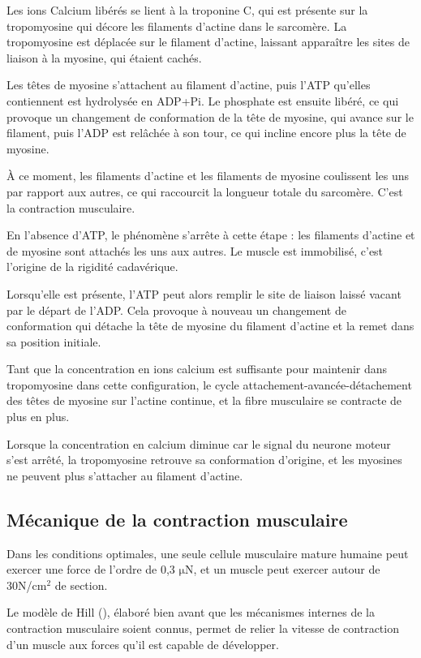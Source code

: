 \documentclass{report}
\newcommand{\micro}{$\mathrm{\mu}$}
\begin{document}
Les ions Calcium libérés se lient à la troponine C, qui est présente sur la tropomyosine qui décore les filaments d'actine dans le sarcomère. La tropomyosine est déplacée sur le filament d'actine, laissant apparaître les sites de liaison à la myosine, qui étaient cachés. 

Les têtes de myosine s'attachent au filament d'actine, puis l'ATP qu'elles contiennent est hydrolysée en ADP+Pi. Le phosphate est ensuite libéré, ce qui provoque un changement de conformation de la tête de myosine, qui avance sur le filament, puis l'ADP est relâchée à son tour, ce qui incline encore plus la tête de myosine. 

À ce moment, les filaments d'actine et les filaments de myosine coulissent les uns par rapport aux autres, ce qui raccourcit la longueur totale du sarcomère. C'est la contraction musculaire. 

En l'absence d'ATP, le phénomène s'arrête à cette étape : les filaments d'actine et de myosine sont attachés les uns aux autres. Le muscle est immobilisé, c'est l'origine de la rigidité cadavérique. 

Lorsqu'elle est présente, l'ATP peut alors remplir le site de liaison laissé vacant par le départ de l'ADP. Cela provoque à nouveau un changement de conformation qui détache la tête de myosine du filament d'actine et la remet dans sa position initiale.

Tant que la concentration en ions calcium est suffisante pour maintenir dans tropomyosine dans cette configuration, le cycle attachement-avancée-détachement des têtes de myosine sur l'actine continue, et la fibre musculaire se contracte de plus en plus. 

Lorsque la concentration en calcium diminue car le signal du neurone moteur s'est arrêté, la tropomyosine retrouve sa conformation d'origine, et les myosines ne peuvent plus s'attacher au filament d'actine. 


\subsection{Mécanique de la contraction musculaire}
Dans les conditions optimales, une seule cellule musculaire mature humaine peut exercer une force de l'ordre de 0,3 \micro N, et un muscle peut exercer autour de 30N/cm$^2$ de section. 

Le modèle de Hill (\cite{hill_heat_1938}), élaboré bien avant que les mécanismes internes de la contraction musculaire soient connus, permet de relier la vitesse de contraction d'un muscle aux forces qu'il est capable de développer. 
\end{document}
